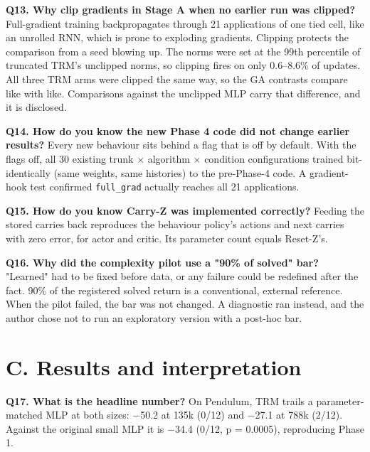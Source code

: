 \documentclass[11pt]{article}
\begin{document}
\textbf{Q13. Why clip gradients in Stage A when no earlier run was clipped?} Full-gradient training backpropagates through 21 applications of one tied cell, like an unrolled RNN, which is prone to exploding gradients. Clipping protects the comparison from a seed blowing up. The norms were set at the 99th percentile of truncated TRM's unclipped norms, so clipping fires on only 0.6--8.6\% of updates. All three TRM arms were clipped the same way, so the GA contrasts compare like with like. Comparisons against the unclipped MLP carry that difference, and it is disclosed.



\textbf{Q14. How do you know the new Phase 4 code did not change earlier results?} Every new behaviour sits behind a flag that is off by default. With the flags off, all 30 existing trunk $\times$ algorithm $\times$ condition configurations trained bit-identically (same weights, same histories) to the pre-Phase-4 code. A gradient-hook test confirmed \texttt{full\_grad} actually reaches all 21 applications.



\textbf{Q15. How do you know Carry-Z was implemented correctly?} Feeding the stored carries back reproduces the behaviour policy's actions and next carries with zero error, for actor and critic. Its parameter count equals Reset-Z's.



\textbf{Q16. Why did the complexity pilot use a "90\% of solved" bar?} "Learned" had to be fixed before data, or any failure could be redefined after the fact. 90\% of the registered solved return is a conventional, external reference. When the pilot failed, the bar was not changed. A diagnostic ran instead, and the author chose not to run an exploratory version with a post-hoc bar.



\section*{C. Results and interpretation}



\textbf{Q17. What is the headline number?} On Pendulum, TRM trails a parameter-matched MLP at both sizes: $-$50.2 at 135k (0/12) and $-$27.1 at 788k (2/12). Against the original small MLP it is $-$34.4 (0/12, p = 0.0005), reproducing Phase 1.
\end{document}
